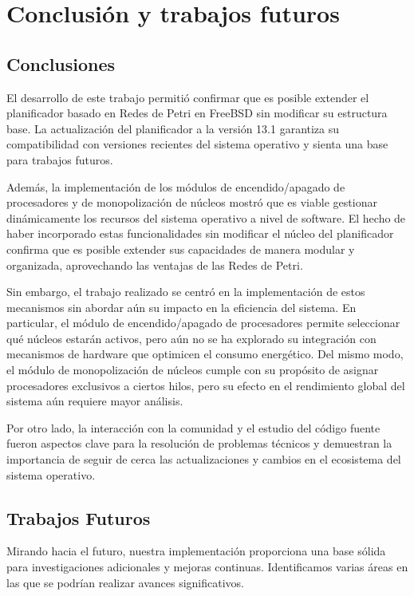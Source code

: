 \section{Conclusión y trabajos futuros}

\subsection{Conclusiones}

El desarrollo de este trabajo permitió confirmar que es posible extender el planificador basado en Redes de Petri en FreeBSD sin modificar su estructura base. La actualización del planificador a la versión 13.1 garantiza su compatibilidad con versiones recientes del sistema operativo y sienta una base para trabajos futuros.

Además, la implementación de los módulos de encendido/apagado de procesadores y de monopolización de núcleos mostró que es viable gestionar dinámicamente los recursos del sistema operativo a nivel de software. El hecho de haber incorporado estas funcionalidades sin modificar el núcleo del planificador confirma que es posible extender sus capacidades de manera modular y organizada, aprovechando las ventajas de las Redes de Petri.

Sin embargo, el trabajo realizado se centró en la implementación de estos mecanismos sin abordar aún su impacto en la eficiencia del sistema. En particular, el módulo de encendido/apagado de procesadores permite seleccionar qué núcleos estarán activos, pero aún no se ha explorado su integración con mecanismos de hardware que optimicen el consumo energético. Del mismo modo, el módulo de monopolización de núcleos cumple con su propósito de asignar procesadores exclusivos a ciertos hilos, pero su efecto en el rendimiento global del sistema aún requiere mayor análisis.

Por otro lado, la interacción con la comunidad y el estudio del código fuente fueron aspectos clave para la resolución de problemas técnicos y demuestran la importancia de seguir de cerca las actualizaciones y cambios en el ecosistema del sistema operativo.

\subsection{Trabajos Futuros}

Mirando hacia el futuro, nuestra implementación proporciona una base sólida para investigaciones adicionales y mejoras continuas. Identificamos varias áreas en las que se podrían realizar avances significativos.

